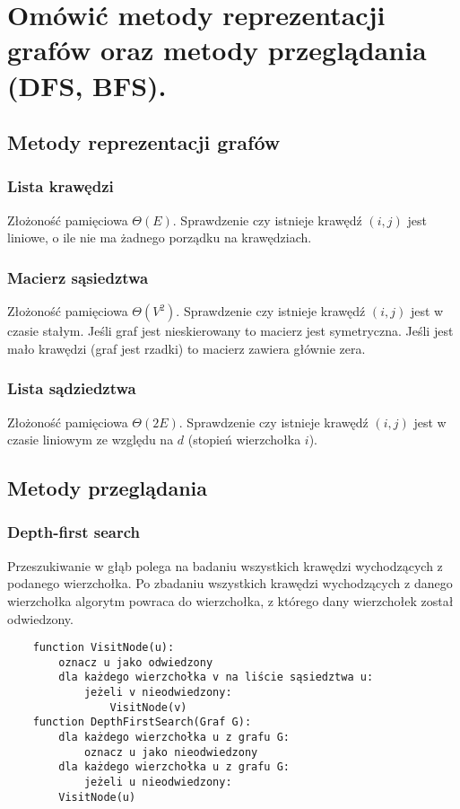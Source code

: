\section{Omówić metody reprezentacji grafów oraz metody przeglądania (DFS, BFS).}

\subsection{Metody reprezentacji grafów}

\subsubsection{Lista krawędzi}
Złożoność pamięciowa $\Theta(E)$.
Sprawdzenie czy istnieje krawędź $(i, j)$ jest liniowe, o ile nie ma żadnego porządku na krawędziach.

\subsubsection{Macierz sąsiedztwa}
Złożoność pamięciowa $\Theta(V^2)$.
Sprawdzenie czy istnieje krawędź $(i, j)$ jest w czasie stałym.
Jeśli graf jest nieskierowany to macierz jest symetryczna.
Jeśli jest mało krawędzi (graf jest rzadki) to macierz zawiera głównie zera.

\subsubsection{Lista sądziedztwa}

Złożoność pamięciowa $\Theta(2E)$.
Sprawdzenie czy istnieje krawędź $(i, j)$ jest w czasie liniowym ze względu na $d$ (stopień wierzchołka $i$).

\subsection{Metody przeglądania}

\subsubsection{Depth-first search}

Przeszukiwanie w głąb polega na badaniu wszystkich krawędzi wychodzących z podanego wierzchołka.
Po zbadaniu wszystkich krawędzi wychodzących z danego wierzchołka algorytm powraca do wierzchołka,
z którego dany wierzchołek został odwiedzony. \\

\begin{samepage}
    \begin{verbatim}
    function VisitNode(u):
        oznacz u jako odwiedzony
        dla każdego wierzchołka v na liście sąsiedztwa u:
            jeżeli v nieodwiedzony:
                VisitNode(v)
    function DepthFirstSearch(Graf G):
        dla każdego wierzchołka u z grafu G:
            oznacz u jako nieodwiedzony
        dla każdego wierzchołka u z grafu G:
            jeżeli u nieodwiedzony:
        VisitNode(u)
    \end{verbatim}
\end{samepage}

